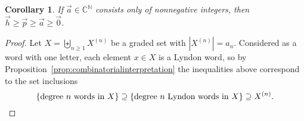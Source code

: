 \documentclass[11pt]{amsart}
\newtheorem{corollary}[theorem]{Corollary}
\theoremstyle{definition}
\numberwithin{equation}{section}
\def\NN{{\mathbb N}}
\def\CC{{\mathbb C}}
\begin{document}
\begin{corollary}
If $\vec{a} \in \CC^{\NN}$ consists only of nonnegative integers, then $\vec{h} \geq \vec{p} \geq \vec{a} \geq \vec{0}$.
\end{corollary}
\begin{proof}
Let $X = \biguplus_{n \ge 1} X^{(n)}$ be a graded set with $|X^{(n)}| = a_{n}$.  
Considered as a word with one letter, each element $x \in X$ is a Lyndon word, so by Proposition~\ref{prop:combinatorialinterpretation} the inequalities above correspond to the set inclusions
\[
\{\text{degree $n$ words in $X$}\} 
\supseteq \{\text{degree $n$ Lyndon words in $X$}\} 
\supseteq X^{(n)}. \qedhere
\]
\end{proof}
\end{document}

